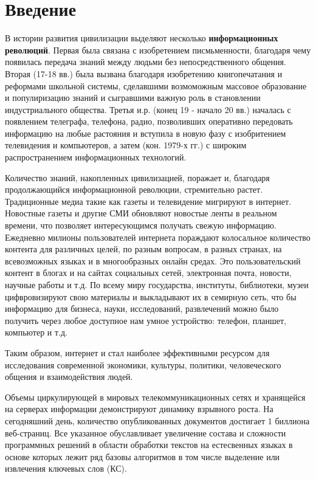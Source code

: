 \section{Введение}
В истории развития цивилизации выделяют несколько \textbf{информационных революций}.
Первая была связана с изобретением писмьменности, благодаря чему появилась передача знаний между людьми без непосредственного общения.
Вторая (17-18 вв.) была вызвана благодаря изобретению книгопечатания и реформами школьной системы, сделавшими возмоможным массовое образование и популиризацию знаний и сыгравшими важную роль в становлении индустриального общества.
Третья и.р. (конец 19 - начало 20 вв.) началась с появлением телеграфа, телефона, радио, позволивших оперативно передовать информацию на любые растояния и вступила в новую фазу с изобритением телевидения и компьютеров, а затем (кон. 1979-х гг.) с широким распространением информационных технологий. \cite{16}

Количество знаний, накопленных цивилизацией, поражает и, благодаря продолжающийся информационной революции, стремительно растет.
Традиционные медиа такие как газеты и телевидение мигрируют в интернет.
Новостные газеты и другие СМИ обновляют новостые ленты в реальном времени, что позволяет интересующимся получать свежую информацию.
Ежедневно милионы пользователей интернета пораждают колосальное количество контента для различных целей, по разным вопросам, в разных странах, на всевозможных языках и в многообразных онлайн средах.
Это пользовательский контент в блогах и на сайтах социальных сетей, электронная почта, новости, научные работы и т.д.
По всему миру государства, институты, библиотеки, музеи цифвровизируют свою материалы и выкладывают их в семирную сеть, что бы информацию для бизнеса, науки, исследований, развлечений можно было получить через любое доступное нам умное устройство: телефон, планшет, компьютер и т.д. \cite{2}

Таким образом, интернет и стал наиболее эффективными ресурсом для исследования современной экономики, культуры, политики, человеческого общения и взаимодействия людей. \cite{2}

Объемы циркулирующей в мировых телекоммуникационных сетях и хранящейся на серверах информации демонстрируют динамику взрывного роста.
На сегодняшний день, количество опубликованных документов достигает 1 биллиона веб-страниц.
Все указанное обуславливает увеличение состава и сложности программных решений в области обработки текстов на естесвенных языках в основе которых лежит ряд базовы алгоритмов в том числе выделение или извлечения ключевых слов (КС).

